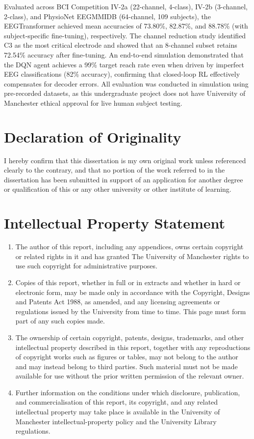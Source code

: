 \documentclass[12pt, a4paper]{article}
\begin{document}
Evaluated across BCI Competition IV-2a (22-channel, 4-class), IV-2b (3-channel, 2-class), and PhysioNet EEGMMIDB (64-channel, 109 subjects), the EEGTransformer achieved mean accuracies of 73.80\%, 82.87\%, and 88.78\% (with subject-specific fine-tuning), respectively. The channel reduction study identified C3 as the most critical electrode and showed that an 8-channel subset retains 72.54\% accuracy after fine-tuning. An end-to-end simulation demonstrated that the DQN agent achieves a 99\% target reach rate even when driven by imperfect EEG classifications (82\% accuracy), confirming that closed-loop RL effectively compensates for decoder errors. All evaluation was conducted in simulation using pre-recorded datasets, as this undergraduate project does not have University of Manchester ethical approval for live human subject testing.
\clearpage

\section*{Declaration of Originality}
I hereby confirm that this dissertation is my own original work unless referenced clearly to the contrary, and that no portion of the work referred to in the dissertation has been submitted in support of an application for another degree or qualification of this or any other university or other institute of learning.
\clearpage

\section*{Intellectual Property Statement}
\begin{enumerate}
    \item The author of this report, including any appendices, owns certain copyright or related rights in it and has granted The University of Manchester rights to use such copyright for administrative purposes.
    \item Copies of this report, whether in full or in extracts and whether in hard or electronic form, may be made only in accordance with the Copyright, Designs and Patents Act 1988, as amended, and any licensing agreements or regulations issued by the University from time to time. This page must form part of any such copies made.
    \item The ownership of certain copyright, patents, designs, trademarks, and other intellectual property described in this report, together with any reproductions of copyright works such as figures or tables, may not belong to the author and may instead belong to third parties. Such material must not be made available for use without the prior written permission of the relevant owner.
    \item Further information on the conditions under which disclosure, publication, and commercialisation of this report, its copyright, and any related intellectual property may take place is available in the University of Manchester intellectual-property policy and the University Library regulations.
\end{enumerate}
\clearpage
\end{document}
